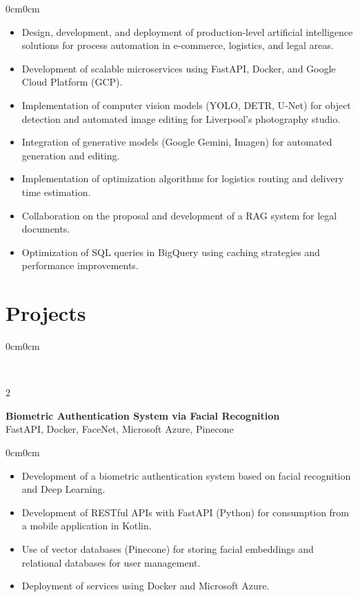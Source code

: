 \documentclass[10pt, letterpaper]{article}
\newenvironment{highlights}{
	\begin{itemize}[topsep=0pt,itemsep=1pt,leftmargin=10pt]
	}{
	\end{itemize}
}
\newenvironment{onecolentry}{
	\begin{adjustwidth}{0cm}{0cm}
	}{
	\end{adjustwidth}
	\vspace{0pt}
}
\newenvironment{twocolentry}[1]{
	\onecolentry
	\columnratio{0.75} 
	\begin{paracol}{2}
		\raggedright #1
		\switchcolumn
	}{
	\end{paracol}
	\endonecolentry
}
\begin{document}
	\begin{onecolentry}
		\begin{highlights}
			\item Design, development, and deployment of production-level artificial intelligence solutions for process automation in e-commerce, logistics, and legal areas.
			
			\item Development of scalable microservices using FastAPI, Docker, and Google Cloud Platform (GCP).
			
			\item Implementation of computer vision models (YOLO, DETR, U-Net) for object detection and automated image editing for Liverpool's photography studio.
			
			\item Integration of generative models (Google Gemini, Imagen) for automated generation and editing.
			
			\item Implementation of optimization algorithms for logistics routing and delivery time estimation.
			
			\item Collaboration on the proposal and development of a RAG system for legal documents.
			
			\item Optimization of SQL queries in BigQuery using caching strategies and performance improvements.
			
		\end{highlights}
	\end{onecolentry}
	
	\section{Projects}
	
	\begin{twocolentry}
		{\textbf{Biometric Authentication System via Facial Recognition}\\
		FastAPI, Docker, FaceNet, Microsoft Azure, Pinecone}
	\end{twocolentry}
	
	\begin{onecolentry}
		\begin{highlights}
			\item Development of a biometric authentication system based on facial recognition and Deep Learning.
			\item Development of RESTful APIs with FastAPI (Python) for consumption from a mobile application in Kotlin.
			\item Use of vector databases (Pinecone) for storing facial embeddings and relational databases for user management.
			\item Deployment of services using Docker and Microsoft Azure.
		\end{highlights}
	\end{onecolentry}
	
\end{document}
